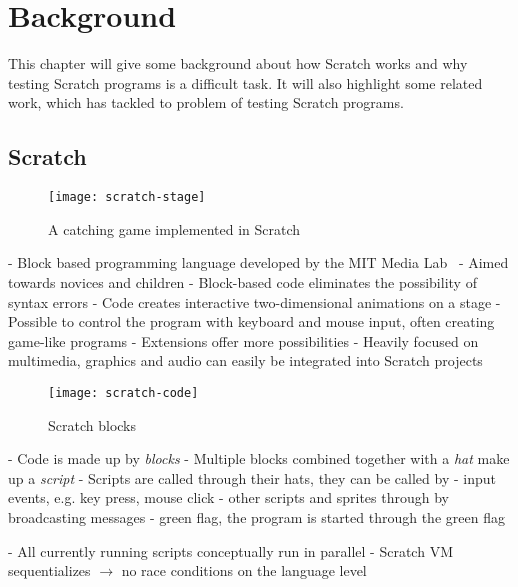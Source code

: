 
\chapter{Background}

This chapter will give some background about how Scratch works and why testing Scratch programs is a difficult task.
It will also highlight some related work, which has tackled to problem of testing Scratch programs.

\section{Scratch}

\begin{wrapfigure}{r}{0.35\textwidth + 5mm}
    \centering
    \vspace{-3mm}
    \texttt{[image: scratch-stage]}
    \caption{A catching game implemented in Scratch}
    \label{fig:a_catching_game_implemented_in_scratch}
\end{wrapfigure}
- Block based programming language developed by the MIT Media Lab~\cite{scratch}
- Aimed towards novices and children
- Block-based code eliminates the possibility of syntax errors
- Code creates interactive two-dimensional animations on a stage
- Possible to control the program with keyboard and mouse input, often creating game-like programs
    - Extensions offer more possibilities
- Heavily focused on multimedia, graphics and audio can easily be integrated into Scratch projects
\parspace

\begin{wrapfigure}{r}{0.45\textwidth + 5mm}
    \centering
    \vspace{-3mm}
    \texttt{[image: scratch-code]}
    \caption{Scratch blocks}
    \label{fig:scratch_blocks}
\end{wrapfigure}
- Code is made up by \textit{blocks}
- Multiple blocks combined together with a \textit{hat} make up a \textit{script}
- Scripts are called through their hats, they can be called by
    - input events, e.g. key press, mouse click
    - other scripts and sprites through by broadcasting messages
    - green flag, the program is started through the green flag

- All currently running scripts conceptually run in parallel
- Scratch VM sequentializes $\rightarrow$ no race conditions on the language level
\parspace

